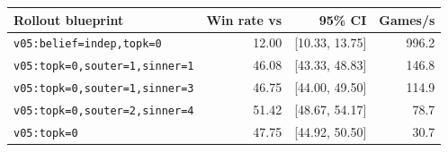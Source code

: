 \begin{tabular}{lrrr}
\toprule
Rollout blueprint & Win rate vs \vfive{} & 95\% CI & Games/s \\
\midrule
\texttt{v05:belief=indep,topk=0} & 12.00 & [10.33, 13.75] & 996.2 \\
\texttt{v05:topk=0,souter=1,sinner=1} & 46.08 & [43.33, 48.83] & 146.8 \\
\texttt{v05:topk=0,souter=1,sinner=3} & 46.75 & [44.00, 49.50] & 114.9 \\
\texttt{v05:topk=0,souter=2,sinner=4} & 51.42 & [48.67, 54.17] & 78.7 \\
\texttt{v05:topk=0} & 47.75 & [44.92, 50.50] & 30.7 \\
\bottomrule
\end{tabular}
